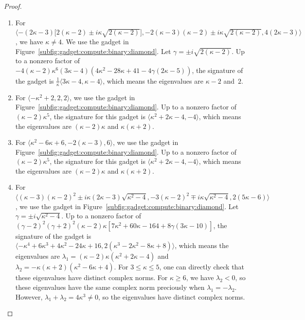 \documentclass[11pt]{article}
\begin{document}
\begin{proof}
\begin{enumerate}
  \item For $\langle -(2 \kappa - 3) \big[2 (\kappa - 2) \pm i \kappa \sqrt{2 (\kappa - 2)}\big], -2 (\kappa - 3) (\kappa - 2) \pm i \kappa \sqrt{2 (\kappa - 2)}, 4 (2 \kappa - 3) \rangle$,
  we have $\kappa \ne 4$.
  We use the gadget in Figure~\ref{subfig:gadget:compute:binary:diamond}.
  Let $\gamma = \pm i \sqrt{2 (\kappa - 2)}$.
  Up to a nonzero factor of $-4 (\kappa - 2) \kappa^6 (3 \kappa - 4) (4 \kappa^2 - 28 \kappa + 41 - 4 \gamma (2 \kappa - 5))$,
  the signature of the gadget is $\frac{1}{\kappa} \langle 3 \kappa - 4, \kappa - 4 \rangle$,
  which means the eigenvalues are $\kappa - 2$ and~$2$.
  
  \item For $\langle -\kappa^2 + 2, 2, 2 \rangle$,
  we use the gadget in Figure~\ref{subfig:gadget:compute:binary:diamond}.
  Up to a nonzero factor of $(\kappa - 2) \kappa^5$,
  the signature for this gadget is $\langle \kappa^2 + 2 \kappa - 4, -4 \rangle$,
  which means the eigenvalues are $(\kappa - 2) \kappa$ and $\kappa (\kappa + 2)$.
  
  \item For $\langle \kappa^2 - 6 \kappa + 6, -2 (\kappa - 3), 6 \rangle$,
  we use the gadget in Figure~\ref{subfig:gadget:compute:binary:diamond}.
  Up to a nonzero factor of $(\kappa - 2) \kappa^5$,
  the signature for this gadget is $\langle \kappa^2 + 2 \kappa - 4, -4 \rangle$,
  which means the eigenvalues are $(\kappa - 2) \kappa$ and $\kappa (\kappa + 2)$.
  
  \item For $\langle (\kappa - 3) (\kappa - 2)^2 \pm i \kappa (2 \kappa - 3) \sqrt{\kappa^2 - 4}, -3 (\kappa - 2)^2 \mp i \kappa \sqrt{\kappa^2 - 4}, 2 (5 \kappa - 6) \rangle$,
  we use the gadget in Figure~\ref{subfig:gadget:compute:binary:diamond}.
  Let $\gamma = \pm i \sqrt{\kappa^2 - 4}$.
  Up to a nonzero factor of $(\gamma - 2)^2 (\gamma + 2)^2 (\kappa - 2) \kappa [7 \kappa^2 + 60 \kappa - 164 + 8 \gamma (3 \kappa - 10)]$,
  the signature of the gadget is $\langle -\kappa^4 + 6 \kappa^3 + 4 \kappa^2 - 24 \kappa + 16, 2 (\kappa^3 - 2 \kappa^2 - 8 \kappa + 8)\rangle$,
  which means the eigenvalues are $\lambda_1 = (\kappa - 2) \kappa (\kappa^2 + 2 \kappa - 4)$ and $\lambda_2 = -\kappa (\kappa + 2) (\kappa^2 - 6 \kappa + 4)$.
  For $3 \le \kappa \le 5$,
  one can directly check that these eigenvalues have distinct complex norms.
  For $\kappa \ge 6$,
  we have $\lambda_2 < 0$,
  so these eigenvalues have the same complex norm preciously when $\lambda_1 = -\lambda_2$.
  However, $\lambda_1 + \lambda_2 = 4 \kappa^3 \ne 0$,
  so the eigenvalues have distinct complex norms.
  

\end{enumerate}
\end{proof}
\end{document}
